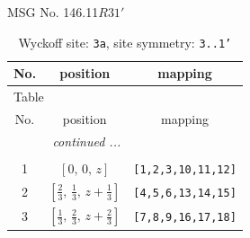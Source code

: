 \documentclass[fleqn,8pt]{jsarticle}
\begin{document}
\setcounter{MaxMatrixCols}{32}

\renewcommand{\tablename}{Table~}
\renewcommand{\figurename}{Figure~}
\begin{center}
\LARGE
MSG No. 146.11\quad$R31'$
\end{center}
\renewcommand{\arraystretch}{1.2}
\begin{longtable}{ccc}
\caption{Wyckoff site: {\tt 3a}, site symmetry: {\tt 3..1'}}
 \\
 \hline \hline
No. & position & mapping \\ \hline \endfirsthead

\multicolumn{2}{l}{\tablename\ \thetable{}} \\
 \hline \hline
No. & position & mapping \\ \hline \endhead

 \hline \hline
\multicolumn{2}{r}{\footnotesize\it continued ...} \\ \endfoot

 \hline \hline
\multicolumn{2}{r}{} \\ \endlastfoot

1 & $\left[ 0,\, 0,\, z \right]$ & {\tt [1,2,3,10,11,12]} \\ \hline
2 & $\left[ \frac{2}{3},\, \frac{1}{3},\, z + \frac{1}{3} \right]$ & {\tt [4,5,6,13,14,15]} \\ \hline
3 & $\left[ \frac{1}{3},\, \frac{2}{3},\, z + \frac{2}{3} \right]$ & {\tt [7,8,9,16,17,18]} \\
\end{longtable}
\renewcommand{\arraystretch}{1.2}
\end{document}

